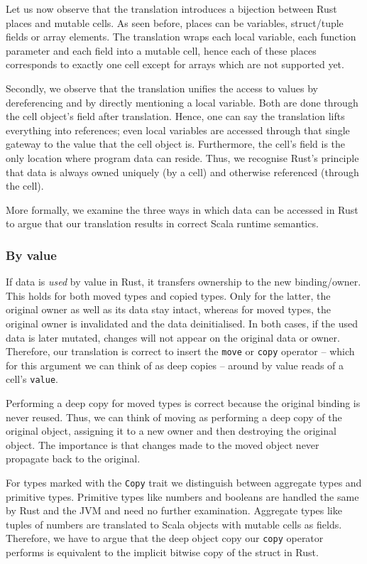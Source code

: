Let us now observe that the translation introduces a bijection between
Rust places and mutable cells. As seen before, places can be variables,
struct/tuple fields or array elements. The translation wraps each local
variable, each function parameter and each field into a mutable cell,
hence each of these places corresponds to exactly one cell except for
arrays which are not supported yet.

Secondly, we observe that the translation unifies the access to values
by dereferencing and by directly mentioning a local variable. Both are
done through the cell object's field after translation. Hence, one can
say the translation lifts everything into references; even local
variables are accessed through that single gateway to the value that the
cell object is. Furthermore, the cell's field is the only location where
program data can reside. Thus, we recognise Rust's principle that data
is always owned uniquely (by a cell) and otherwise referenced (through
the cell).

More formally, we examine the three ways in which data can be accessed
in Rust to argue that our translation results in correct Scala runtime
semantics.

\subsubsection{By value}
\label{sec:correctness-by-value}

If data is \emph{used} by value in Rust, it transfers ownership to the
new binding/owner. This holds for both moved types and copied types.
Only for the latter, the original owner as well as its data stay intact,
whereas for moved types, the original owner is invalidated and the data
deinitialised. In both cases, if the used data is later mutated, changes
will not appear on the original data or owner. Therefore, our
translation is correct to insert the \passthrough{\lstinline!move!} or
\passthrough{\lstinline!copy!} operator -- which for this argument we
can think of as deep copies -- around by value reads of a cell's
\passthrough{\lstinline!value!}.

Performing a deep copy for moved types is correct because the original
binding is never reused. Thus, we can think of moving as performing a
deep copy of the original object, assigning it to a new owner and then
destroying the original object. The importance is that changes made to
the moved object never propagate back to the original.

For types marked with the \passthrough{\lstinline!Copy!} trait we
distinguish between aggregate types and primitive types. Primitive types
like numbers and booleans are handled the same by Rust and the JVM and
need no further examination. Aggregate types like tuples of numbers are
translated to Scala objects with mutable cells as fields. Therefore, we
have to argue that the deep object copy our
\passthrough{\lstinline!copy!} operator performs is equivalent to the
implicit bitwise copy of the struct in Rust.

